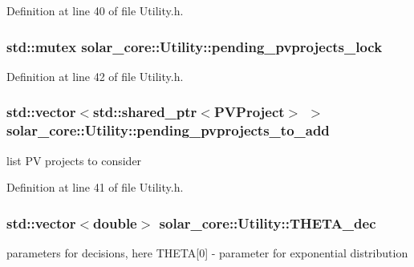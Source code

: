 Definition at line 40 of file Utility.\+h.

\hypertarget{classsolar__core_1_1_utility_a7100cb063e2dbdf0f5ac2cff9cf3d030}{}
\subsubsection[{pending\+\_\+pvprojects\+\_\+lock}]{\setlength{\rightskip}{0pt plus 5cm}std\+::mutex solar\+\_\+core\+::\+Utility\+::pending\+\_\+pvprojects\+\_\+lock\hspace{0.3cm}{\ttfamily [protected]}}\label{classsolar__core_1_1_utility_a7100cb063e2dbdf0f5ac2cff9cf3d030}


Definition at line 42 of file Utility.\+h.

\hypertarget{classsolar__core_1_1_utility_ae3b66140590b19d4c448aa8f8f559906}{}
\subsubsection[{pending\+\_\+pvprojects\+\_\+to\+\_\+add}]{\setlength{\rightskip}{0pt plus 5cm}std\+::vector$<$std\+::shared\+\_\+ptr$<${\bf P\+V\+Project}$>$ $>$ solar\+\_\+core\+::\+Utility\+::pending\+\_\+pvprojects\+\_\+to\+\_\+add\hspace{0.3cm}{\ttfamily [protected]}}\label{classsolar__core_1_1_utility_ae3b66140590b19d4c448aa8f8f559906}
list P\+V projects to consider 

Definition at line 41 of file Utility.\+h.

\hypertarget{classsolar__core_1_1_utility_a32f7a95da732c6e48c15804277886a45}{}
\subsubsection[{T\+H\+E\+T\+A\+\_\+dec}]{\setlength{\rightskip}{0pt plus 5cm}std\+::vector$<$double$>$ solar\+\_\+core\+::\+Utility\+::\+T\+H\+E\+T\+A\+\_\+dec\hspace{0.3cm}{\ttfamily [protected]}}\label{classsolar__core_1_1_utility_a32f7a95da732c6e48c15804277886a45}
parameters for decisions, here T\+H\+E\+T\+A\mbox{[}0\mbox{]} -\/ parameter for exponential distribution 


